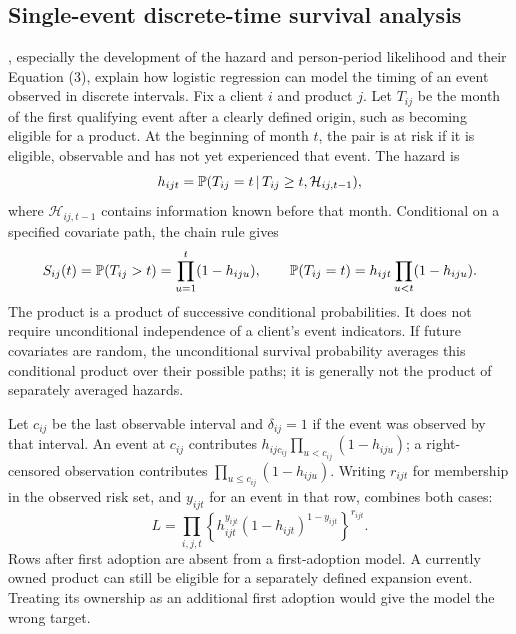 \subsection{Single-event discrete-time survival analysis}

\citet{singer1993time}, especially the development of the hazard and person-period likelihood and their Equation (3), explain how logistic regression can model the timing of an event observed in discrete intervals. Fix a client $i$ and product $j$. Let $T_{ij}$ be the month of the first qualifying event after a clearly defined origin, such as becoming eligible for a product. At the beginning of month $t$, the pair is at risk if it is eligible, observable and has not yet experienced that event. The hazard is
\begin{equation}
 h_{ijt}=\mathbb{P}(T_{ij}=t\,|\, T_{ij}\ge t,\mathcal H_{ij,t-1}),
 \label{eq:hazard}
\end{equation}
where $\mathcal H_{ij,t-1}$ contains information known before that month. Conditional on a specified covariate path, the chain rule gives
\begin{equation}
 S_{ij}(t)=\mathbb{P}(T_{ij}>t)=\prod_{u=1}^{t}(1-h_{iju}),\qquad
 \mathbb{P}(T_{ij}=t)=h_{ijt}\prod_{u<t}(1-h_{iju}).
 \label{eq:survival-product}
\end{equation}
The product is a product of successive conditional probabilities. It does not require unconditional independence of a client's event indicators. If future covariates are random, the unconditional survival probability averages this conditional product over their possible paths; it is generally not the product of separately averaged hazards.

Let $c_{ij}$ be the last observable interval and $\delta_{ij}=1$ if the event was observed by that interval. An event at $c_{ij}$ contributes $h_{ijc_{ij}}\prod_{u<c_{ij}}(1-h_{iju})$; a right-censored observation contributes $\prod_{u\le c_{ij}}(1-h_{iju})$. Writing $r_{ijt}$ for membership in the observed risk set, and $y_{ijt}$ for an event in that row, combines both cases:
\begin{equation}
 L=\prod_{i,j,t}\left\{h_{ijt}^{y_{ijt}}(1-h_{ijt})^{1-y_{ijt}}\right\}^{r_{ijt}}.
 \label{eq:first-event}
\end{equation}
Rows after first adoption are absent from a first-adoption model. A currently owned product can still be eligible for a separately defined expansion event. Treating its ownership as an additional first adoption would give the model the wrong target.

